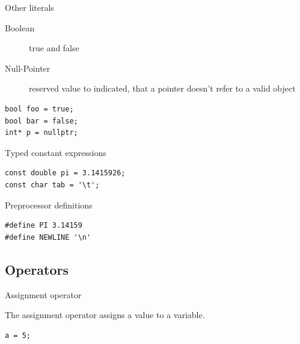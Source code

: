 \documentclass{beamer}
\begin{document}
\begin{frame}[fragile]{Other literals}
\begin{description}
\item[Boolean] true and false
\item[Null-Pointer] reserved value to indicated, that a pointer doesn't refer to
a valid object
\end{description}
\begin{lstlisting}[caption=Other literals]
bool foo = true;
bool bar = false;
int* p = nullptr;
\end{lstlisting}
\end{frame}

\begin{frame}[fragile]{Typed constant expressions}
\begin{lstlisting}[caption=Typed constant expressions]
const double pi = 3.1415926;
const char tab = '\t';
\end{lstlisting}
\end{frame}

\begin{frame}[fragile]{Preprocessor definitions}
\begin{lstlisting}[caption=Preprocessor definitions]
#define PI 3.14159
#define NEWLINE '\n'
\end{lstlisting}
\end{frame}


\subsection{Operators}

\begin{frame}[fragile]{Assignment operator}
\begin{definition}
The assignment operator assigns a value to a variable.
\end{definition}

\begin{lstlisting}[caption=Assignment operator]
a = 5;
\end{lstlisting}

\end{frame}
\end{document}
